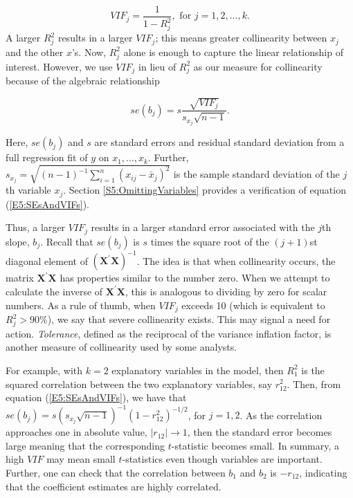 \begin{equation*}
VIF_j=\frac{1}{1-R_j^2},\text{ \ \ \ for \ }j=1,2,...,k.
\end{equation*}
A larger $R_j^2$ results in a larger $VIF_j$; this means greater
collinearity between $x_j$ and the other $x$'s. Now, $R_j^2$ alone
is enough to capture the linear relationship of interest. However,
we use $VIF_j$ in lieu of $R_j^2$ as our measure for collinearity
because of the algebraic relationship

\begin{equation} \label{E5:SEsAndVIFs}
se(b_j) = s \frac{\sqrt{VIF_j}}{s_{x_j}\sqrt{n-1}} .
\end{equation}

\noindent Here, $se(b_j)$ and $s$ are standard errors and residual
standard deviation from a full regression fit of $y$ on
$x_1,...,x_{k}$. Further, $s_{x_j} = \sqrt{(n-1)^{-1}
\sum_{i=1}^{n}(x_{ij}-\bar{x}_j)^2 }$ is the sample standard
deviation of the $j$th variable $x_j$. Section
\ref{S5:OmittingVariables} provides a verification of equation
(\ref{E5:SEsAndVIFs}).

Thus, a larger $VIF_j$ results in a larger standard error associated
with the $j$th slope, $b_j$. Recall that $se(b_j)$ is $s$ times the
square root of the $(j+1)$st diagonal element of
$(\mathbf{X^{\prime} X})^{-1}$. The idea is that when collinearity
occurs, the matrix $\mathbf{X^{\prime}X}$ has properties similar to
the number zero. When we attempt to calculate the inverse of
$\mathbf{X^{\prime} X}$, this is analogous to dividing by zero for
scalar numbers. As a rule of thumb, when $VIF_j$ exceeds 10 (which
is equivalent to $R_j^2>90\%$), we say that severe collinearity
exists. This may signal a need for action. \emph{Tolerance}, defined
as the reciprocal of the variance inflation factor, is another
measure of collinearity used by some
analysts.


For example, with $k=2$ explanatory variables in the model, then
$R_1^2$ is the squared correlation between the two explanatory
variables, say $r_{12}^2$. Then, from equation
(\ref{E5:SEsAndVIFs}), we have that $se(b_j) = s\left( s_{x_j}
\sqrt{n-1} \right)^{-1} \left( 1-r_{12}^2\right)^{-1/2}$, for
$j=1,2$. As the correlation approaches one in absolute value,
$|r_{12}| \rightarrow 1$, then the standard error becomes large
meaning that the corresponding $t$-statistic becomes small. In
summary, a high $VIF$ may mean small $t$-statistics even though
variables are important. Further, one can check that the correlation
between $b_1$ and $b_2$ is $-r_{12}$, indicating that the
coefficient estimates are highly correlated.



